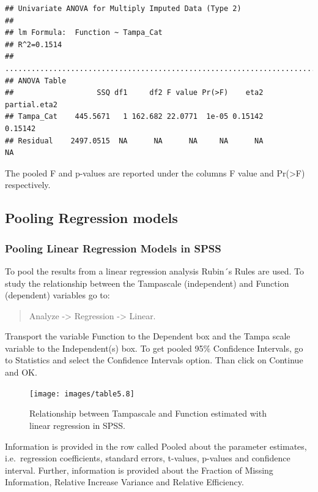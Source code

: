 \documentclass[
]{book}
\begin{document}
\begin{verbatim}
## Univariate ANOVA for Multiply Imputed Data (Type 2)  
## 
## lm Formula:  Function ~ Tampa_Cat
## R^2=0.1514 
## ..........................................................................
## ANOVA Table 
##                   SSQ df1     df2 F value Pr(>F)    eta2 partial.eta2
## Tampa_Cat    445.5671   1 162.682 22.0771  1e-05 0.15142      0.15142
## Residual    2497.0515  NA      NA      NA     NA      NA           NA
\end{verbatim}

The pooled F and p-values are reported under the columns F value and Pr(\textgreater F) respectively.

\hypertarget{pooling-regression-models}{%
\subsection{Pooling Regression models}\label{pooling-regression-models}}

\hypertarget{pooling-linear-regression-models-in-spss}{%
\subsubsection{Pooling Linear Regression Models in SPSS}\label{pooling-linear-regression-models-in-spss}}

To pool the results from a linear regression analysis Rubin´s Rules are used. To study the relationship between the Tampascale (independent) and Function (dependent) variables go to:

\begin{quote}
Analyze -\textgreater{} Regression -\textgreater{} Linear.
\end{quote}

Transport the variable Function to the Dependent box and the Tampa scale variable to the Independent(s) box. To get pooled 95\% Confidence Intervals, go to Statistics and select the Confidence Intervals option. Than click on Continue and OK.

\begin{figure}

{\centering \texttt{[image: images/table5.8]} 

}

\caption{Relationship between Tampascale and Function estimated with linear regression in SPSS.}\label{fig:tab5-8}
\end{figure}

Information is provided in the row called Pooled about the parameter estimates, i.e.~regression coefficients, standard errors, t-values, p-values and confidence interval. Further, information is provided about the Fraction of Missing Information, Relative Increase Variance and Relative Efficiency.
\end{document}
